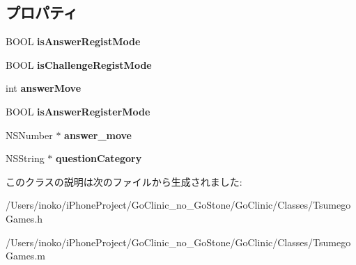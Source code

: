 \subsection*{プロパティ}
\begin{DoxyCompactItemize}
\item 
\hypertarget{interface_tsumego_games_a3375d97ef44aba34e33511c28cdb2a2c}{
BOOL {\bfseries isAnswerRegistMode}}
\label{interface_tsumego_games_a3375d97ef44aba34e33511c28cdb2a2c}

\item 
\hypertarget{interface_tsumego_games_aefa9d02ce652c338affce12cffe6774d}{
BOOL {\bfseries isChallengeRegistMode}}
\label{interface_tsumego_games_aefa9d02ce652c338affce12cffe6774d}

\item 
\hypertarget{interface_tsumego_games_ad144851ee8786da63195f0cff5a9e786}{
int {\bfseries answerMove}}
\label{interface_tsumego_games_ad144851ee8786da63195f0cff5a9e786}

\item 
\hypertarget{interface_tsumego_games_a97c121892a434b48bcac817f7ddd7005}{
BOOL {\bfseries isAnswerRegisterMode}}
\label{interface_tsumego_games_a97c121892a434b48bcac817f7ddd7005}

\item 
\hypertarget{interface_tsumego_games_af42640758d6ef9a9cdb894ee0f0262e1}{
NSNumber $\ast$ {\bfseries answer\_\-move}}
\label{interface_tsumego_games_af42640758d6ef9a9cdb894ee0f0262e1}

\item 
\hypertarget{interface_tsumego_games_afee34c738156cf3d24ad43164b2318d2}{
NSString $\ast$ {\bfseries questionCategory}}
\label{interface_tsumego_games_afee34c738156cf3d24ad43164b2318d2}

\end{DoxyCompactItemize}


このクラスの説明は次のファイルから生成されました:\begin{DoxyCompactItemize}
\item 
/Users/inoko/iPhoneProject/GoClinic\_\-no\_\-GoStone/GoClinic/Classes/TsumegoGames.h\item 
/Users/inoko/iPhoneProject/GoClinic\_\-no\_\-GoStone/GoClinic/Classes/TsumegoGames.m\end{DoxyCompactItemize}
